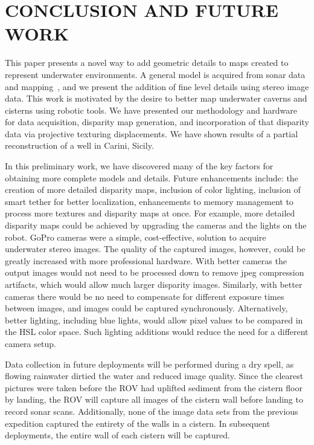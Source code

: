 \documentclass[a4paper,twoside]{article}
\begin{document}

\section{\uppercase{Conclusion and Future Work}}
\label{sec:conclusion}

\noindent 
This paper presents a novel way to add geometric details to maps created to represent underwater environments. A general model is acquired from sonar data and mapping~\cite{ICEX11,McVicker,McVicker2}, and we present the addition of fine level details using stereo image data.  This work is motivated by the desire to better map underwater caverns and cisterns using robotic tools.  We have presented our methodology and hardware for data acquisition, disparity map generation, and incorporation of that disparity data via projective texturing displacements.  We have shown results of a partial reconstruction of a well in Carini, Sicily.

In this preliminary work, we have discovered many of the key factors for obtaining more complete models and details.  Future enhancements include: the creation of more detailed disparity maps, inclusion of color lighting, inclusion of smart tether for better localization, enhancements to memory management to process more textures and disparity maps at once.
For example, more detailed disparity maps could be achieved by upgrading the cameras and the lights on the robot.
GoPro cameras were a simple, cost-effective, solution to acquire underwater stereo images.
The quality of the captured images, however, could be greatly increased with more professional hardware.
With better cameras the output images would not need to be processed down to remove jpeg compression artifacts, which would allow much larger disparity images.  
Similarly, with better cameras there would be no need to compensate for different exposure times between images, and images could be captured synchronously.
Alternatively, better lighting, including blue lights, would allow pixel values to be compared in the HSL color space.
Such lighting additions would reduce the need for a different camera setup.

Data collection in future deployments will be performed during a dry spell, as flowing rainwater dirtied the water and reduced image quality. Since the clearest pictures were taken before the ROV had uplifted sediment from the cistern floor by landing, the ROV will capture all images of the cistern wall before landing to record sonar scans. Additionally, none of the image data sets from the previous expedition captured the entirety of the walls in a cistern. In subsequent deployments, the entire wall of each cistern will be captured.
\end{document}
